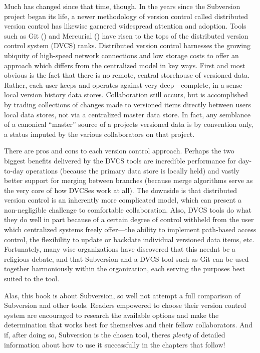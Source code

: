 Much has changed since that time, though. In the years since the
Subversion project began its life, a newer methodology of version
control called distributed version control has likewise garnered
widespread attention and adoption. Tools such as Git
(\href{https://git-scm.com/}{}) and Mercurial
(\href{https://www.mercurial-scm.org/}{}) have risen to the tops of the
distributed version control system (DVCS) ranks. Distributed version
control harnesses the growing ubiquity of high-speed network connections
and low storage costs to offer an approach which differs from the
centralized model in key ways. First and most obvious is the fact that
there is no remote, central storehouse of versioned data. Rather, each
user keeps and operates against very deep---complete, in a sense---local
version history data stores. Collaboration still occurs, but is
accomplished by trading collections of changes made to versioned items
directly between users\textquotesingle{} local data stores, not via a
centralized master data store. In fact, any semblance of a canonical
``master'' source of a project\textquotesingle s versioned data is by
convention only, a status imputed by the various collaborators on that
project.

There are pros and cons to each version control approach. Perhaps the
two biggest benefits delivered by the DVCS tools are incredible
performance for day-to-day operations (because the primary data store is
locally held) and vastly better support for merging between branches
(because merge algorithms serve as the very core of how DVCSes work at
all). The downside is that distributed version control is an inherently
more complicated model, which can present a non-negligible challenge to
comfortable collaboration. Also, DVCS tools do what they do well in part
because of a certain degree of control withheld from the user which
centralized systems freely offer---the ability to implement path-based
access control, the flexibility to update or backdate individual
versioned data items, etc. Fortunately, many wise organizations have
discovered that this needn\textquotesingle t be a religious debate, and
that Subversion and a DVCS tool such as Git can be used together
harmoniously within the organization, each serving the purposes best
suited to the tool.

Alas, this book is about Subversion, so we\textquotesingle ll not
attempt a full comparison of Subversion and other tools. Readers
empowered to choose their version control system are encouraged to
research the available options and make the determination that works
best for themselves and their fellow collaborators. And if, after doing
so, Subversion is the chosen tool, there\textquotesingle s \emph{plenty}
of detailed information about how to use it successfully in the chapters
that follow!

